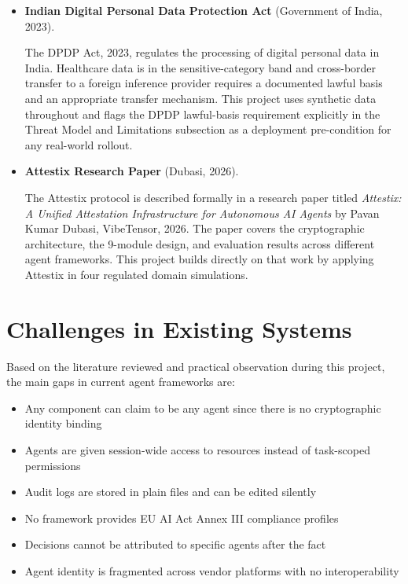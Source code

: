 \begin{itemize}
\item \textbf{Indian Digital Personal Data Protection Act} (Government of India, 2023).

The DPDP Act, 2023, regulates the processing of digital personal data in India. Healthcare data is in the sensitive-category band and cross-border transfer to a foreign inference provider requires a documented lawful basis and an appropriate transfer mechanism. This project uses synthetic data throughout and flags the DPDP lawful-basis requirement explicitly in the Threat Model and Limitations subsection as a deployment pre-condition for any real-world rollout.

\item \textbf{Attestix Research Paper} (Dubasi, 2026).

The Attestix protocol is described formally in a research paper titled \textit{Attestix: A Unified Attestation Infrastructure for Autonomous AI Agents} by Pavan Kumar Dubasi, VibeTensor, 2026. The paper covers the cryptographic architecture, the 9-module design, and evaluation results across different agent frameworks. This project builds directly on that work by applying Attestix in four regulated domain simulations.

\end{itemize}

\newpage

\section{Challenges in Existing Systems}

Based on the literature reviewed and practical observation during this project, the main gaps in current agent frameworks are:

\begin{itemize}
    \item Any component can claim to be any agent since there is no cryptographic identity binding
    \item Agents are given session-wide access to resources instead of task-scoped permissions
    \item Audit logs are stored in plain files and can be edited silently
    \item No framework provides EU AI Act Annex III compliance profiles
    \item Decisions cannot be attributed to specific agents after the fact
    \item Agent identity is fragmented across vendor platforms with no interoperability
\end{itemize}

